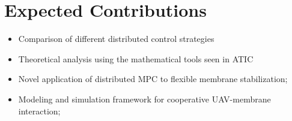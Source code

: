 \documentclass[11pt]{article}
\begin{document}
\section{Expected Contributions}

\begin{itemize}
    \item Comparison of different distributed control strategies
    \item Theoretical analysis using the mathematical tools seen in ATIC
    \item Novel application of distributed MPC to flexible membrane stabilization;
    \item Modeling and simulation framework for cooperative UAV-membrane interaction;
   
\end{itemize}
\end{document}
